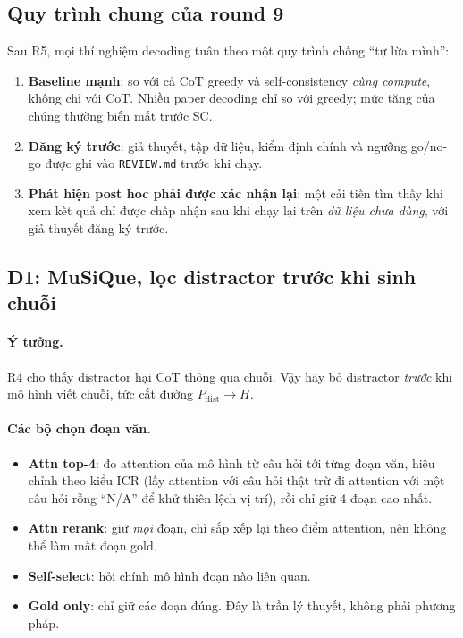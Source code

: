 \documentclass[11pt]{article}
\begin{document}
\subsection{Quy trình chung của round 9}

\begin{thietke}
Sau R5, mọi thí nghiệm decoding tuân theo một quy trình chống ``tự lừa mình'':
\begin{enumerate}[leftmargin=*,itemsep=1pt]
\item \textbf{Baseline mạnh}: so với cả CoT greedy và self-consistency \emph{cùng compute}, không
  chỉ với CoT. Nhiều paper decoding chỉ so với greedy; mức tăng của chúng thường biến mất trước SC.
\item \textbf{Đăng ký trước}: giả thuyết, tập dữ liệu, kiểm định chính và ngưỡng go/no-go được ghi
  vào \texttt{REVIEW.md} trước khi chạy.
\item \textbf{Phát hiện post hoc phải được xác nhận lại}: một cải tiến tìm thấy khi xem kết quả chỉ
  được chấp nhận sau khi chạy lại trên \emph{dữ liệu chưa dùng}, với giả thuyết đăng ký trước.
\end{enumerate}
\end{thietke}

\subsection{D1: MuSiQue, lọc distractor trước khi sinh chuỗi}

\paragraph{Ý tưởng.} R4 cho thấy distractor hại CoT thông qua chuỗi. Vậy hãy bỏ distractor
\emph{trước} khi mô hình viết chuỗi, tức cắt đường $P_{\text{dist}}\to H$.

\paragraph{Các bộ chọn đoạn văn.}
\begin{itemize}[leftmargin=*,itemsep=1pt]
\item \textbf{Attn top-4}: đo attention của mô hình từ câu hỏi tới từng đoạn văn, hiệu chỉnh theo
  kiểu ICR (lấy attention với câu hỏi thật trừ đi attention với một câu hỏi rỗng ``N/A'' để khử
  thiên lệch vị trí), rồi chỉ giữ 4 đoạn cao nhất.
\item \textbf{Attn rerank}: giữ \emph{mọi} đoạn, chỉ sắp xếp lại theo điểm attention, nên không thể
  làm mất đoạn gold.
\item \textbf{Self-select}: hỏi chính mô hình đoạn nào liên quan.
\item \textbf{Gold only}: chỉ giữ các đoạn đúng. Đây là trần lý thuyết, không phải phương pháp.
\end{itemize}
\end{document}
